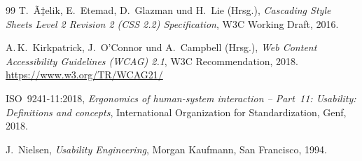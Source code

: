 ﻿\documentclass[a4paper,12pt]{article}
\theoremstyle{definition}
\begin{document}
\begin{thebibliography}{99}
T.~Ã‡elik, E.~Etemad, D.~Glazman und H.~Lie (Hrsg.),
\textit{Cascading Style Sheets Level 2 Revision 2 (CSS 2.2) Specification},
W3C Working Draft, 2016.

A.\,K.~Kirkpatrick, J.~O'Connor und A.~Campbell (Hrsg.),
\textit{Web Content Accessibility Guidelines (WCAG) 2.1},
W3C Recommendation, 2018. \url{https://www.w3.org/TR/WCAG21/}

ISO~9241-11:2018,
\textit{Ergonomics of human-system interaction -- Part~11: Usability: Definitions and concepts},
International Organization for Standardization, Genf, 2018.

J.~Nielsen,
\textit{Usability Engineering},
Morgan Kaufmann, San Francisco, 1994.

\end{thebibliography}
\end{document}
